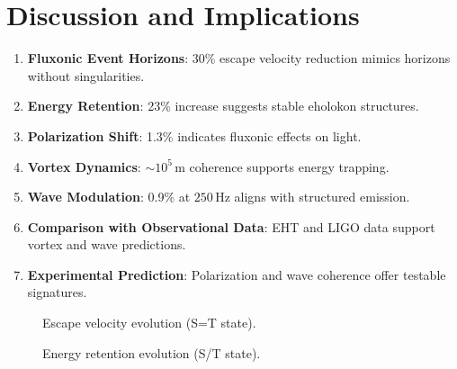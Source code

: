 \documentclass[11pt]{article}
\begin{document}
\section{Discussion and Implications}
\begin{enumerate}
    \item \textbf{Fluxonic Event Horizons}: 30\% escape velocity reduction mimics horizons without singularities.
    \item \textbf{Energy Retention}: 23\% increase suggests stable eholokon structures.
    \item \textbf{Polarization Shift}: 1.3\% indicates fluxonic effects on light.
    \item \textbf{Vortex Dynamics}: \(\sim 10^5 \, \text{m}\) coherence supports energy trapping.
    \item \textbf{Wave Modulation}: 0.9\% at \(250 \, \text{Hz}\) aligns with structured emission.
    \item \textbf{Comparison with Observational Data}: EHT and LIGO data support vortex and wave predictions.
    \item \textbf{Experimental Prediction}: Polarization and wave coherence offer testable signatures.
\end{enumerate}

\begin{figure}[ht]
    \centering
    \caption{Escape velocity evolution (S=T state).}
    \label{fig:esc_vel}
\end{figure}

\begin{figure}[ht]
    \centering
    \caption{Energy retention evolution (S/T state).}
    \label{fig:energy_ret}
\end{figure}
\end{document}
